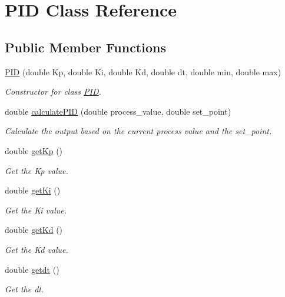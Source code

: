\hypertarget{classPID}{}\section{P\+ID Class Reference}
\label{classPID}
\subsection*{Public Member Functions}
\begin{DoxyCompactItemize}
\item 
\hyperlink{classPID_a74e83c18b71000d5e9d9ff4f0832045c}{P\+ID} (double Kp, double Ki, double Kd, double dt, double min, double max)
\begin{DoxyCompactList}\small\item\em Constructor for class \hyperlink{classPID}{P\+ID}. \end{DoxyCompactList}\item 
double \hyperlink{classPID_a125885733fe1d5e6dfe28fe83117f9ab}{calculate\+P\+ID} (double process\+\_\+value, double set\+\_\+point)
\begin{DoxyCompactList}\small\item\em Calculate the output based on the current process value and the set\+\_\+point. \end{DoxyCompactList}\item 
double \hyperlink{classPID_a52625de61b1b2977b2c26ddb2698f14e}{get\+Kp} ()
\begin{DoxyCompactList}\small\item\em Get the Kp value. \end{DoxyCompactList}\item 
double \hyperlink{classPID_a89dedae29ef5a1359fd438824523bfc5}{get\+Ki} ()
\begin{DoxyCompactList}\small\item\em Get the Ki value. \end{DoxyCompactList}\item 
double \hyperlink{classPID_a39997546e8d1025c6c867e31e8b8e916}{get\+Kd} ()
\begin{DoxyCompactList}\small\item\em Get the Kd value. \end{DoxyCompactList}\item 
double \hyperlink{classPID_a642e7bc12fbd7ecfe465d50be8d20b36}{getdt} ()
\begin{DoxyCompactList}\small\item\em Get the dt. \end{DoxyCompactList}\end{DoxyCompactItemize}


